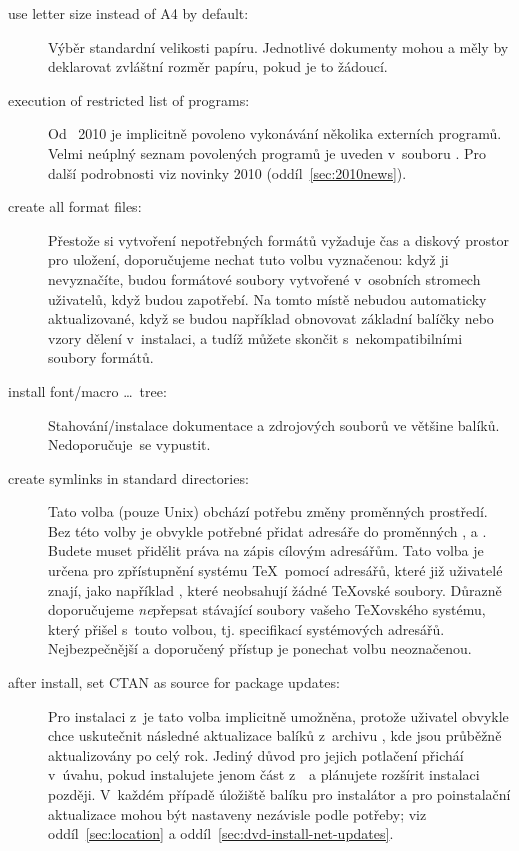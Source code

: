 \documentclass[\classoptions,slovak,english,czech]{\classname}
\begin{document}
\begin{description}
\item[use letter size instead of A4 by default:] Výběr standardní velikosti papíru.  
Jednotlivé dokumenty mohou a měly by deklarovat zvláštní 
rozměr papíru, pokud je to žádoucí.

\item[execution of restricted list of programs:] 
Od \TL\ 2010 je implicitně povoleno vykonávání
několika externích programů. Velmi neúplný seznam 
povolených programů je uveden v~souboru .
Pro další podrobnosti viz novinky 2010 (oddíl~\ref{sec:2010news}).

\item[create all format files:] Přestože si vytvoření nepotřebných formátů
vyžaduje čas a diskový prostor pro uložení, doporučujeme nechat
tuto volbu vyznačenou: když ji nevyznačíte, budou formátové soubory
vytvořené v~osobních stromech  uživatelů, když budou
zapotřebí. Na tomto místě nebudou automaticky aktualizované, když se budou
například obnovovat základní balíčky nebo vzory dělení v~instalaci, a tudíž můžete
skončit s~nekompatibilními soubory formátů.

\item[install font/macro \ldots\ tree:] Stahování/instalace 
dokumentace a zdrojových souborů ve většine balíků.
Nedoporučuje~se vypustit.

\item[create symlinks in standard directories:] 
Tato volba (pouze Unix) obchází potřebu změny proměnných prostředí. Bez této 
volby je obvykle potřebné přidat adresáře \TL{} do proměnných
,  a . 
Budete muset přidělit práva na zápis cílovým adresářům. Tato volba je 
určena pro zpřístupnění systému \TeX\ pomocí adresářů, 
které již uživatelé znají, jako například , 
které neobsahují žádné \TeX ovské soubory. Důrazně doporučujeme \emph{ne}přepsat 
stávající soubory vašeho \TeX ovského systému, 
který přišel s~touto volbou, tj. specifikací systémových adresářů.
Nejbezpečnější a doporučený přístup je ponechat volbu neoznačenou.

\item[after install, set CTAN as source for package updates:]
Pro instalaci z~\DVD je
tato volba implicitně umožněna, protože uživatel obvykle chce uskutečnit
následné aktualizace balíků z~archivu \CTAN, kde jsou průběžně 
aktualizovány po celý rok. Jediný důvod pro jejich potlačení 
přicháí v~úvahu, pokud instalujete jenom část z~\DVD\ a plánujete
rozšírit instalaci později. V~každém případě úložiště balíku pro
instalátor a pro poinstalační aktualizace mohou být nastaveny nezávisle
podle potřeby; viz oddíl~\ref{sec:location}
 a oddíl~\ref{sec:dvd-install-net-updates}.
\end{description}
\end{document}
